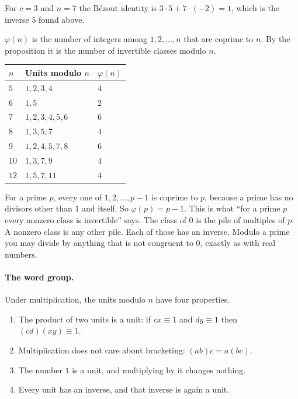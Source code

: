 For $c = 3$ and $n = 7$ the B\'ezout identity is $3 \cdot 5 + 7 \cdot (-2) = 1$, which is the inverse $5$ found above.

\begin{definition}
$\varphi(n)$ is the number of integers among $1, 2, \dots, n$ that are coprime to $n$. By the proposition it is the number of invertible classes modulo $n$.
\end{definition}

\begin{center}\small
\begin{tabular}{lll}
\toprule
$n$ & Units modulo $n$ & $\varphi(n)$ \\
\midrule
$5$ & $1, 2, 3, 4$ & $4$ \\
$6$ & $1, 5$ & $2$ \\
$7$ & $1, 2, 3, 4, 5, 6$ & $6$ \\
$8$ & $1, 3, 5, 7$ & $4$ \\
$9$ & $1, 2, 4, 5, 7, 8$ & $6$ \\
$10$ & $1, 3, 7, 9$ & $4$ \\
$12$ & $1, 5, 7, 11$ & $4$ \\
\bottomrule
\end{tabular}
\end{center}

For a prime $p$, every one of $1, 2, \dots, p - 1$ is coprime to $p$, because a prime has no divisors other than $1$ and itself. So $\varphi(p) = p - 1$. This is what ``for a prime $p$ every nonzero class is invertible'' says. The class of $0$ is the pile of multiples of $p$. A nonzero class is any other pile. Each of those has an inverse. Modulo a prime you may divide by anything that is not congruent to $0$, exactly as with real numbers.

\paragraph{The word group.} Under multiplication, the units modulo $n$ have four properties.

\begin{enumerate}[nosep,leftmargin=*]
\item The product of two units is a unit: if $cx \equiv 1$ and $dy \equiv 1$ then $(cd)(xy) \equiv 1$.
\item Multiplication does not care about bracketing: $(ab)c = a(bc)$.
\item The number $1$ is a unit, and multiplying by it changes nothing.
\item Every unit has an inverse, and that inverse is again a unit.
\end{enumerate}

